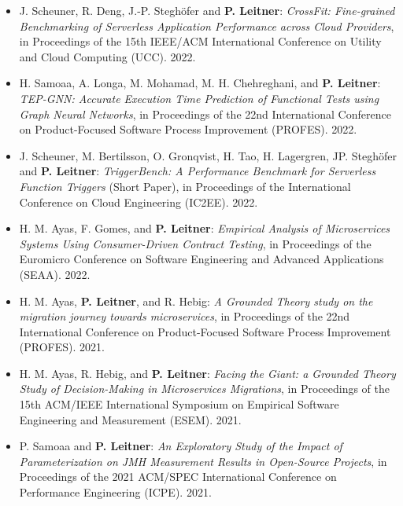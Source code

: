 \documentclass[paper=letter,fontsize=11pt]{scrartcl} %
\begin{document}
\begin{itemize}
  \item J. Scheuner, R. Deng, J.-P. Steghöfer and \textbf{P. Leitner}: \emph{CrossFit: Fine-grained Benchmarking of Serverless Application Performance across Cloud Providers}, in Proceedings of the 15th IEEE/ACM International Conference on Utility and Cloud Computing (UCC). 2022. 
  \item H. Samoaa, A. Longa, M. Mohamad, M. H. Chehreghani, and \textbf{P. Leitner}: \emph{TEP-GNN: Accurate Execution Time Prediction of Functional Tests using Graph Neural Networks}, in Proceedings of the 22nd International Conference on Product-Focused Software Process Improvement (PROFES). 2022. 
  \item  J. Scheuner, M. Bertilsson, O. Gronqvist, H. Tao, H. Lagergren, JP. Steghöfer and \textbf{P. Leitner}: \emph{TriggerBench: A Performance Benchmark for Serverless Function Triggers} (Short Paper), in Proceedings of the International Conference on Cloud Engineering (IC2EE). 2022. 
  \item H. M. Ayas, F. Gomes, and \textbf{P. Leitner}: \emph{Empirical Analysis of Microservices Systems Using Consumer-Driven Contract Testing}, in Proceedings of the Euromicro Conference on Software Engineering and Advanced Applications (SEAA). 2022. 
  \item H. M. Ayas, \textbf{P. Leitner}, and R. Hebig: \emph{A Grounded Theory study on the migration journey towards microservices}, in Proceedings of the 22nd International Conference on Product-Focused Software Process Improvement (PROFES). 2021. 
  \item H. M. Ayas, R. Hebig, and \textbf{P. Leitner}: \emph{Facing the Giant: a Grounded Theory Study of Decision-Making in Microservices Migrations}, in Proceedings of the 15th ACM/IEEE International Symposium on Empirical Software Engineering and Measurement (ESEM). 2021. 
  \item P. Samoaa and \textbf{P. Leitner}: \emph{An Exploratory Study of the Impact of Parameterization on JMH Measurement Results in Open-Source Projects}, in Proceedings of the 2021 ACM/SPEC  International Conference on Performance Engineering (ICPE). 2021.  
\end{itemize}
\end{document}
